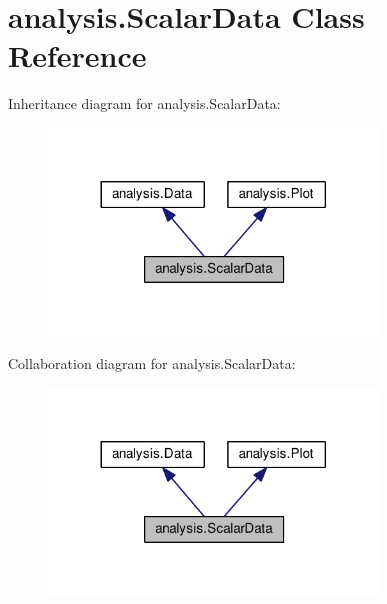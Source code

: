 \hypertarget{classanalysis_1_1ScalarData}{}\section{analysis.\+Scalar\+Data Class Reference}
\label{classanalysis_1_1ScalarData}


Inheritance diagram for analysis.\+Scalar\+Data\+:
\nopagebreak
\begin{figure}[H]
\begin{center}
\leavevmode
\includegraphics[width=248pt]{classanalysis_1_1ScalarData__inherit__graph}
\end{center}
\end{figure}


Collaboration diagram for analysis.\+Scalar\+Data\+:
\nopagebreak
\begin{figure}[H]
\begin{center}
\leavevmode
\includegraphics[width=248pt]{classanalysis_1_1ScalarData__coll__graph}
\end{center}
\end{figure}
